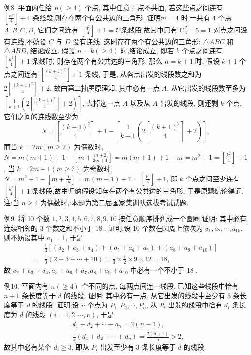 例8. 平面内任给 $n(\geqslant 4)$ 个点, 其中任意 4 点不共面, 若这些点之间连有 $\left[\frac{n^2}{4}\right]+1$ 条线段,则存在两个有公共边的三角形.
证明:$n=4$ 时,一共有 4 个点 $A, B, C, D$, 它们之间连有 $\left[\frac{4^2}{4}\right]+1=5$ 条线段,故其中只有 $\mathrm{C}_4^2-5=1$ 对点之间没有连线,不妨设 $C$ 与 $D$ 没有连线, 这时存在两个有公共边的三角形: $\triangle A B C$ 和 $\triangle A B D$, 结论成立.
假设 $n=k(\geqslant 4)$ 时,结论成立, 即若 $k$ 个点之间连有 $\left[\frac{k^2}{4}\right]+1$ 条线时, 则存在两个有公共边的三角形, 那么 $n=k+1$ 时, 假设 $k+1$ 个点之间连有 $\left[\frac{(k+1)^2}{4}\right]+1$ 条线, 于是, 从各点出发的线段数之和为 $2\left[\frac{(k+1)^2}{4}\right]+2$, 故由第二抽屉原理知, 其中必有一点 $A$, 从它出发的线段数至多为 $\left[\frac{1}{k+1}\left(2\left[\frac{(k+1)^2}{4}\right]+2\right)\right]$, 去掉这一点 $A$ 以及从 $A$ 出发的线段, 则还剩 $k$ 个点, 它们之间的连线数至少为
$$
N=\left[\frac{(k+1)^2}{4}\right]+1-\left[\frac{1}{k+1}\left(2\left[\frac{(k+1)^2}{4}\right]+2\right)\right],
$$
而当 $k=2 m(m \geqslant 2)$ 为偶数时, $N=m(m+1)+1-\left[m+\frac{m+2}{2 m+1}\right]= m(m+1)+1-m=m^2+1=\left[\frac{k^2}{4}\right]+1$, 当 $k=2 m-1(m \geqslant 3)$ 为奇数时, $N= m^2+1-\left[m+\frac{1}{m}\right]=m(m-1)+1=\left[\frac{k^2}{4}\right]+1$, 即 $k$ 个点之间至少连有 $\left[\frac{k^2}{4}\right]+1$ 条线段,故由归纳假设知存在两个有公共边的三角形, 于是原题结论得证.
注:当 $n \geqslant 4$ 为偶数时, 本题为第二届国家集训队选拔考试试题.



例9. 将 10 个数 $1,2,3,4,5,6,7,8,9,10$ 按任意顺序排列成一个圆圈,证明: 其中必有连续相邻的 3 个数之和不小于 18 .
证明:设 10 个数在圆周上依次为 $a_1, a_2, \cdots, a_{10}$, 则不妨设其中 $a_1=1$, 于是
$$
\begin{aligned}
& \frac{1}{3}\left[\left(a_2+a_3+a_4\right)+\left(a_5+a_6+a_7\right)+\left(a_8+a_9+a_{10}\right)\right] \\
= & \frac{1}{3}(2+3+\cdots+10)=\frac{1}{3} \times \frac{1}{2} \times 9 \times 12=18,
\end{aligned}
$$
故 $a_2+a_3+a_4, a_5+a_6+a_7, a_8+a_9+a_{10}$ 中必有一个不小于 18 .



例10. 平面内有 $n(\geqslant 4)$ 个不同的点, 每两点间连一线段, 已知这些线段中恰有 $n+1$ 条长度等于 $d$ 的线段.
证明: 其中必有一点, 从它出发的线段中至少有 3 条长度等于 $d$ 的线段.
证明:设 $n$ 个点为 $P_1, P_2, \cdots, P_n$, 从 $P_i$ 出发的线段中恰有 $d_i$ 条长度为 $d$ 的线段 $(i=1,2, \cdots, n)$, 于是
$$
\begin{aligned}
& d_1+d_2+\cdots+d_n=2(n+1), \\
& \frac{1}{n}\left(d_1+d_2+\cdots+d_n\right)=\frac{2(n+1)}{n}>2,
\end{aligned}
$$
故其中必有某个 $d_i \geqslant 3$, 即从 $P_i$ 出发至少有 3 条长度等于 $d$ 的线段.



